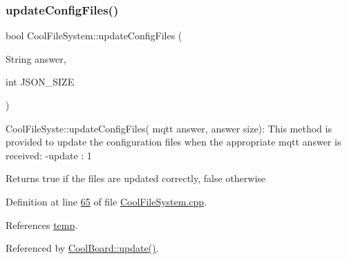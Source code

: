 \subsubsection{\texorpdfstring{update\+Config\+Files()}{updateConfigFiles()}}
{\footnotesize\ttfamily bool Cool\+File\+System\+::update\+Config\+Files (\begin{DoxyParamCaption}\item[{String}]{answer,  }\item[{int}]{J\+S\+O\+N\+\_\+\+S\+I\+ZE }\end{DoxyParamCaption})}

Cool\+File\+Syste\+::update\+Config\+Files( mqtt answer, answer size)\+: This method is provided to update the configuration files when the appropriate mqtt answer is received\+: -\/update \+: 1

\begin{DoxyReturn}{Returns}
true if the files are updated correctly, false otherwise 
\end{DoxyReturn}


Definition at line \hyperlink{_cool_file_system_8cpp_source_l00065}{65} of file \hyperlink{_cool_file_system_8cpp_source}{Cool\+File\+System.\+cpp}.



References \hyperlink{_irene3000_8h_source_l00025}{temp}.



Referenced by \hyperlink{_cool_board_8cpp_source_l00411}{Cool\+Board\+::update()}.


